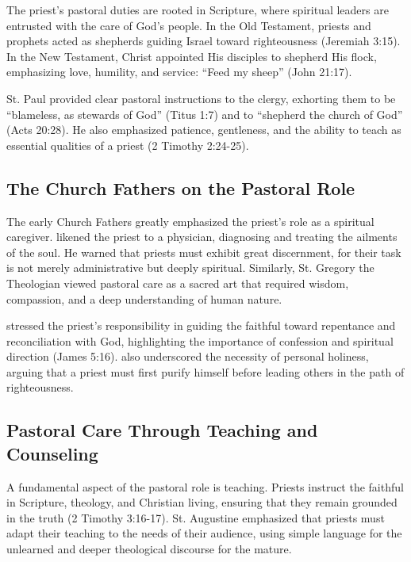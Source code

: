 \documentclass[12pt, doc]{apa7}   	%
\begin{document}
The priest’s pastoral duties are rooted in Scripture, where spiritual leaders are entrusted with the care of God’s people. In the Old Testament, priests and prophets acted as shepherds guiding Israel toward righteousness (Jeremiah 3:15). In the New Testament, Christ appointed His disciples to shepherd His flock, emphasizing love, humility, and service: ``Feed my sheep'' (John 21:17).

St. Paul provided clear pastoral instructions to the clergy, exhorting them to be ``blameless, as stewards of God'' (Titus 1:7) and to ``shepherd the church of God'' (Acts 20:28). He also emphasized patience, gentleness, and the ability to teach as essential qualities of a priest (2 Timothy 2:24-25).

\subsection{The Church Fathers on the Pastoral Role}

The early Church Fathers greatly emphasized the priest’s role as a spiritual caregiver. \citet{priesthood_chrysostom,complete_work_chrysostom} likened the priest to a physician, diagnosing and treating the ailments of the soul. He warned that priests must exhibit great discernment, for their task is not merely administrative but deeply spiritual. Similarly, St. Gregory the Theologian \citep{early_church_akin} viewed pastoral care as a sacred art that required wisdom, compassion, and a deep understanding of human nature.

\citet{priesthood_shenouda} stressed the priest’s responsibility in guiding the faithful toward repentance and reconciliation with God, highlighting the importance of confession and spiritual direction (James 5:16). \citet{st_basil_letters} also underscored the necessity of personal holiness, arguing that a priest must first purify himself before leading others in the path of righteousness.

\subsection{Pastoral Care Through Teaching and Counseling}

A fundamental aspect of the pastoral role is teaching. Priests instruct the faithful in Scripture, theology, and Christian living, ensuring that they remain grounded in the truth (2 Timothy 3:16-17). St. Augustine \citep{early_church_akin} emphasized that priests must adapt their teaching to the needs of their audience, using simple language for the unlearned and deeper theological discourse for the mature.
\end{document}
